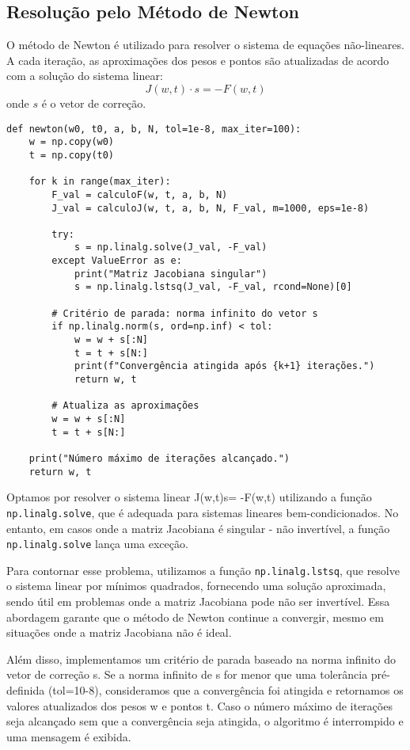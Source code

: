 \documentclass[12pt,letterpaper]{article}
\begin{document}
\subsection{Resolução pelo Método de Newton}
O método de Newton é utilizado para resolver o sistema de equações não-lineares. A cada iteração, as aproximações dos pesos e pontos são atualizadas de acordo com a solução do sistema linear:
\[
J(w, t) \cdot s = -F(w, t)
\]
onde \(s\) é o vetor de correção.

\begin{lstlisting}[style=Python]
def newton(w0, t0, a, b, N, tol=1e-8, max_iter=100):
    w = np.copy(w0)
    t = np.copy(t0)
    
    for k in range(max_iter):
        F_val = calculoF(w, t, a, b, N)
        J_val = calculoJ(w, t, a, b, N, F_val, m=1000, eps=1e-8)
        
        try:
            s = np.linalg.solve(J_val, -F_val)
        except ValueError as e:
            print("Matriz Jacobiana singular")
            s = np.linalg.lstsq(J_val, -F_val, rcond=None)[0]
        
        # Critério de parada: norma infinito do vetor s
        if np.linalg.norm(s, ord=np.inf) < tol:
            w = w + s[:N]
            t = t + s[N:]
            print(f"Convergência atingida após {k+1} iterações.")
            return w, t
        
        # Atualiza as aproximações
        w = w + s[:N]
        t = t + s[N:]
    
    print("Número máximo de iterações alcançado.")
    return w, t
\end{lstlisting}

Optamos por resolver o sistema linear J(w,t)s= -F(w,t) utilizando a função \texttt{np.linalg.solve}, que é adequada para sistemas lineares bem-condicionados. No entanto, em casos onde a matriz Jacobiana é singular - não invertível, a função \texttt{np.linalg.solve} lança uma exceção. 

Para contornar esse problema, utilizamos a função \texttt{np.linalg.lstsq}, que resolve o sistema linear por mínimos quadrados, fornecendo uma solução aproximada, sendo útil em problemas onde a matriz Jacobiana pode não ser invertível. Essa abordagem garante que o método de Newton continue a convergir, mesmo em situações onde a matriz Jacobiana não é ideal.

Além disso, implementamos um critério de parada baseado na norma infinito do vetor de correção s. Se a norma infinito de s for menor que uma tolerância pré-definida (tol=10-8), consideramos que a convergência foi atingida e retornamos os valores atualizados dos pesos w e pontos t. Caso o número máximo de iterações seja alcançado sem que a convergência seja atingida, o algoritmo é interrompido e uma mensagem é exibida.
\end{document}
